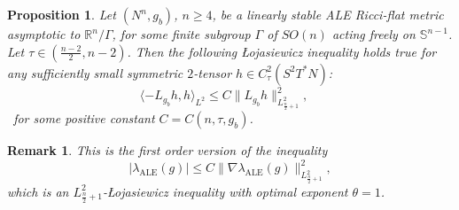 \documentclass[a4paper,11pt,reqno]{amsart}
\newtheorem{prop}[defn]{Proposition}
\newtheorem{rk}[defn]{Remark}
\def\RR{\mathbb{R}}
\numberwithin{equation}{section}
\begin{document}
	\begin{prop}\label{prop-baby-loja-l2n/2+1} Let $(N^n,g_b)$, $n\geq 4$, be a linearly stable ALE Ricci-flat metric asymptotic to $\RR^n\slash\Gamma$, for some finite subgroup $\Gamma$ of $SO(n)$ acting freely on $\mathbb{S}^{n-1}$. Let  $\tau\in\left(\frac{n-2}{2},n-2\right)$. Then the following \L{}ojasiewicz inequality holds true for any sufficiently small symmetric $2$-tensor $h\in C_{\tau}^{2}(S^2T^*N)$:
		\begin{equation}
		\langle-L_{g_b} h,h\rangle_{L^2}\leq C\|L_{g_b}h\|^2_{L^2_{\frac{n}{2}+1}}, \quad \label{loja-ineq-stab-babyL2n/2+1}
		\end{equation}\
		for some positive constant $C=C(n,\tau,g_b)$.\\
	\end{prop}
	\begin{rk}
		This is the first order version of the inequality 
		$$|\lambda_{\operatorname{ALE}}(g)|\leq C \|\nabla \lambda_{\operatorname{ALE}}(g)\|^2_{L^2_{\frac{n}{2}+1}},$$
		which is an $L^2_{\frac{n}{2}+1}$-\L{}ojasiewicz inequality with optimal exponent $\theta=1$.
	\end{rk}
\end{document}
